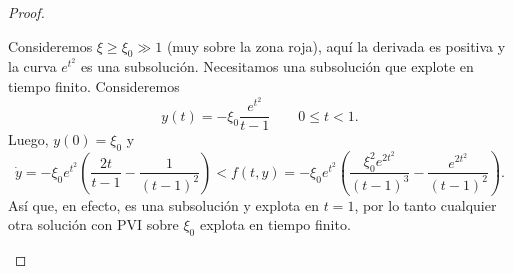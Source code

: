 \begin{proof}
\begin{plist}
    \item Consideremos \(\xi \ge \xi_0 \gg 1\) (muy sobre la zona roja),
    aquí la derivada es positiva y la curva \(e^{t^2}\) es una subsolución.
    Necesitamos una subsolución que explote en tiempo finito.
    Consideremos
    \[
        y(t) = - \xi_0 \frac{e^{t^2}}{t-1}
        \qquad
        0 \le t < 1
    .\]
    Luego, \(y(0) = \xi_0\) y
    \[
        \dot{y} =
        -\xi_0 e^{t^2} \left(\frac{2t}{t-1} - \frac{1}{(t-1)^2}\right)
        <
        f(t,y) =
        -\xi_{0} e^{t^2} \left(
            \frac{\xi_0^2 e^{2t^2}}{(t-1)^3} - \frac{e^{2t^2}}{(t-1)^2}
        \right)
    .\]
    Así que, en efecto, es una subsolución y explota en \(t=1\), por lo tanto
    cualquier otra solución con PVI sobre \(\xi_0\) explota en tiempo finito.
\end{plist}
\end{proof}

